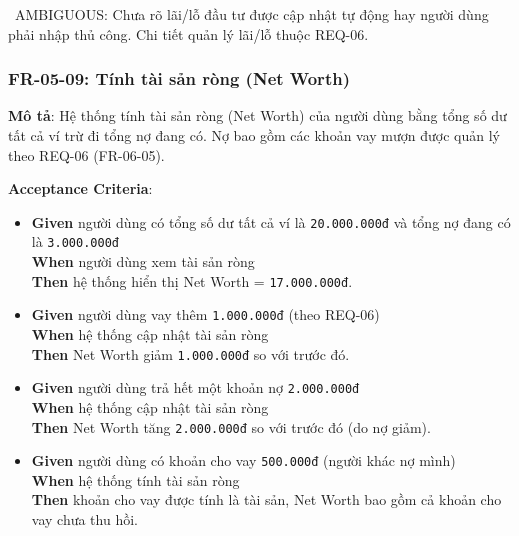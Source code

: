 \warningicon\  AMBIGUOUS: Chưa rõ lãi/lỗ đầu tư được cập nhật tự động hay người dùng phải nhập thủ công. Chi tiết quản lý lãi/lỗ thuộc REQ-06.



\subsubsection{FR-05-09: Tính tài sản ròng (Net Worth)}

\textbf{Mô tả}: Hệ thống tính tài sản ròng (Net Worth) của người dùng bằng tổng số dư tất cả ví trừ đi tổng nợ đang có. Nợ bao gồm các khoản vay mượn được quản lý theo REQ-06 (FR-06-05).



\textbf{Acceptance Criteria}:

\begin{itemize}
\item \textbf{Given} người dùng có tổng số dư tất cả ví là \texttt{20.000.000đ} và tổng nợ đang có là \texttt{3.000.000đ}  \\ \hspace*{1.5em}  \textbf{When} người dùng xem tài sản ròng  \\ \hspace*{1.5em}  \textbf{Then} hệ thống hiển thị Net Worth = \texttt{17.000.000đ}.
\item \textbf{Given} người dùng vay thêm \texttt{1.000.000đ} (theo REQ-06)  \\ \hspace*{1.5em}  \textbf{When} hệ thống cập nhật tài sản ròng  \\ \hspace*{1.5em}  \textbf{Then} Net Worth giảm \texttt{1.000.000đ} so với trước đó.
\item \textbf{Given} người dùng trả hết một khoản nợ \texttt{2.000.000đ}  \\ \hspace*{1.5em}  \textbf{When} hệ thống cập nhật tài sản ròng  \\ \hspace*{1.5em}  \textbf{Then} Net Worth tăng \texttt{2.000.000đ} so với trước đó (do nợ giảm).
\item \textbf{Given} người dùng có khoản cho vay \texttt{500.000đ} (người khác nợ mình)  \\ \hspace*{1.5em}  \textbf{When} hệ thống tính tài sản ròng  \\ \hspace*{1.5em}  \textbf{Then} khoản cho vay được tính là tài sản, Net Worth bao gồm cả khoản cho vay chưa thu hồi.

\end{itemize}
